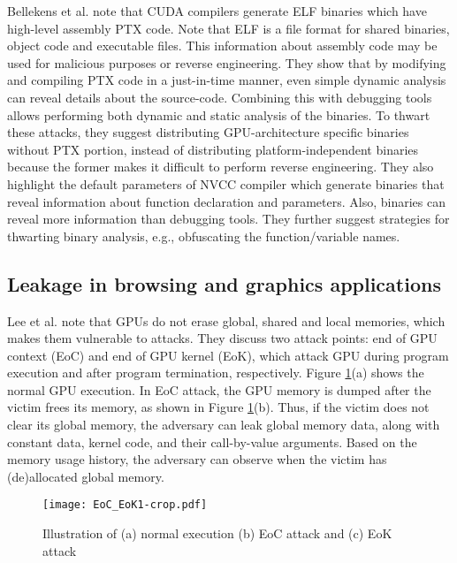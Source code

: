 Bellekens et al. \cite{bellekens2016strategies} note that CUDA compilers generate ELF binaries which have high-level assembly PTX code. Note that ELF is a file format for shared binaries, object code and executable files.  This information about assembly code may be used for malicious purposes or reverse engineering. They show that by modifying and compiling PTX code in a just-in-time manner, even simple dynamic analysis can reveal details about the source-code. Combining this with debugging tools allows performing both dynamic and static analysis of the binaries. To thwart these attacks, they suggest distributing GPU-architecture specific binaries without PTX portion, instead of distributing platform-independent binaries because the former makes it difficult to perform reverse engineering. They also highlight the default parameters of NVCC compiler which generate binaries that reveal information about function declaration and parameters. Also, binaries can reveal more information than debugging tools. They further suggest strategies for thwarting binary analysis, e.g., obfuscating the function/variable names.



  
\subsection{Leakage in browsing and graphics applications}\label{sec:leakagewebbrowser} 

Lee et al. \cite{lee2014stealing} note that GPUs do not erase global, shared and local memories, which makes them vulnerable to attacks. They discuss two attack points: end of GPU context (EoC) and end of GPU kernel (EoK), which attack GPU during program execution and after program termination, respectively. Figure \ref{fig:stealingWebpagesAttack}(a) shows the normal GPU execution. In EoC attack, the GPU memory is dumped after the victim frees its memory, as shown in Figure  \ref{fig:stealingWebpagesAttack}(b). Thus, if the victim does not clear its global memory, the adversary can leak global memory data, along with constant data, kernel code,  and their call-by-value arguments. Based on the memory usage history, the adversary can observe when the victim has (de)allocated global memory. 

  \begin{figure} [htbp]
\centering
\texttt{[image: EoC\_EoK1-crop.pdf]}
\caption{Illustration of (a) normal execution (b) EoC attack and (c) EoK attack \cite{lee2014stealing}}\label{fig:stealingWebpagesAttack}
\end{figure}
 

